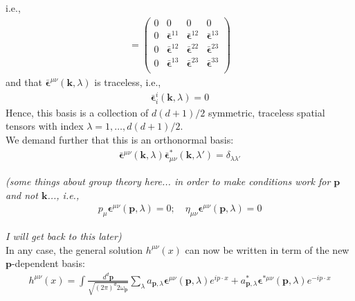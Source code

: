 \documentclass{book}
\theoremstyle{definition}
\newcommand{\f}[2]{\frac{#1}{#2}}
\begin{document}
i.e.,
\begin{align}
[\bar{\mathbf{\epsilon}}^{\mu\nu}] = \begin{pmatrix}
0 &0&0&0\\
0&\bar{\mathbf{\epsilon}}^{11}&\bar{\mathbf{\epsilon}}^{12}&\bar{\mathbf{\epsilon}}^{13}\\
0&\bar{\mathbf{\epsilon}}^{12}&\bar{\mathbf{\epsilon}}^{22}&\bar{\mathbf{\epsilon}}^{23}\\
0&\bar{\mathbf{\epsilon}}^{13}&\bar{\mathbf{\epsilon}}^{23}&\bar{\mathbf{\epsilon}}^{33}\\
\end{pmatrix}
\end{align}
and that $\bar{\mathbf{\epsilon}}^{\mu\nu}(\mathbf{k},\lambda)$ is traceless, i.e.,
\begin{align}
\boxed{\bar{\mathbf{\epsilon}}^i_i(\mathbf{k},\lambda) = 0}
\end{align}
Hence, this basis is a collection of $d(d+1)/2$ symmetric, traceless spatial tensors with index $\lambda = 1,\dots,d(d+1)/2$. \\

We demand further that this is an orthonormal basis:
\begin{align}
\boxed{\bar{\mathbf{\epsilon}}^{\mu\nu}(\mathbf{k},\lambda)\bar{\mathbf{\epsilon}}^*_{\mu\nu}(\mathbf{k},\lambda') = \delta_{\lambda\lambda'}}
\end{align}


\textit{(some things about group theory here... in order to make conditions work for $\mathbf{p}$ and not $\mathbf{k}$..., i.e.,}
\begin{align}
\boxed{p_\mu \mathbf{\epsilon}^{\mu\nu}(\mathbf{p},\lambda) = 0; \quad \eta_{\mu\nu}\mathbf{\epsilon}^{\mu\nu}(\mathbf{p},\lambda) = 0}
\end{align}

\textit{I will get back to this later)}\\

In any case, the general solution $h^{\mu\nu}(x)$ can now be written in term of the new $\mathbf{p}$-dependent basis:
\begin{align}
h^{\mu\nu}(x) = \int \f{d^d\mathbf{p}}{\sqrt{(2\pi)^d 2\omega_\mathbf{p}}} \sum_\lambda a_{\mathbf{p},\lambda} \mathbf{\epsilon}^{\mu\nu}(\mathbf{p},\lambda)e^{ip\cdot x} + a^*_{\mathbf{p},\lambda} \mathbf{\epsilon}^{*\mu\nu}(\mathbf{p},\lambda)e^{-ip\cdot x}
\end{align}
\end{document}

